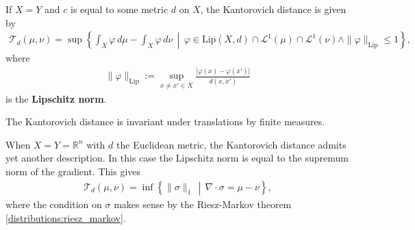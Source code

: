 
    \begin{theorem}
        If $X=Y$ and $c$ is equal to some metric $d$ on $X$, the Kantorovich distance is given by
        \begin{gather}
            \mathcal{T}_d(\mu,\nu) = \sup\left\{\int_X\varphi\,d\mu-\int_X\varphi\,d\nu\,\middle\vert\,\varphi\in\mathrm{Lip}(X,d)\cap\mathcal{L}^1(\mu)\cap\mathcal{L}^1(\nu)\land\|\varphi\|_\mathrm{Lip}\leq1\right\},
        \end{gather}
        where
        \begin{gather}
            \|\varphi\|_\mathrm{Lip} := \sup_{x\neq x'\in X}\frac{|\varphi(x)-\varphi(x')|}{d(x,x')}
        \end{gather}
        is the \textbf{Lipschitz norm}.
    \end{theorem}

    \begin{property}
        The Kantorovich distance is invariant under translations by finite measures.
    \end{property}

    \begin{property}
        When $X=Y=\mathbb{R}^n$ with $d$ the Euclidean metric, the Kantorovich distance admits yet another description. In this case the Lipschitz norm is equal to the supremum norm of the gradient. This gives
        \begin{gather}
            \mathcal{T}_d(\mu,\nu) = \inf\left\{\|\sigma\|_1\,\middle\vert\,\nabla\cdot\sigma=\mu-\nu\right\},
        \end{gather}
        where the condition on $\sigma$ makes sense by the Riesz-Markov theorem \ref{distributions:riesz_markov}.
    \end{property}

